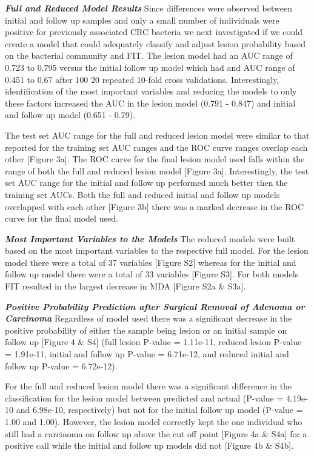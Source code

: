 \documentclass[12pt,]{article}
\begin{document}
\textbf{\emph{Full and Reduced Model Results}} Since differences were
observed between initial and follow up samples and only a small number
of individuals were positive for previously associated CRC bacteria we
next investigated if we could create a model that could adequately
classify and adjust lesion probability based on the bacterial community
and FIT. The lesion model had an AUC range of 0.723 to 0.795 versus the
initial follow up model which had and AUC range of 0.451 to 0.67 after
100 20 repeated 10-fold cross validations. Interestingly, identification
of the most important variables and reducing the models to only these
factors increased the AUC in the lesion model (0.791 - 0.847) and
initial and follow up model (0.651 - 0.79).

The test set AUC range for the full and reduced lesion model were
similar to that reported for the training set AUC ranges and the ROC
curve ranges overlap each other {[}Figure 3a{]}. The ROC curve for the
final lesion model used falls within the range of both the full and
reduced lesion model {[}Figure 3a{]}. Interestingly, the test set AUC
range for the initial and follow up performed much better then the
training set AUCs. Both the full and reduced initial and follow up
models overlapped with each other {[}Figure 3b{]} there was a marked
decrease in the ROC curve for the final model used.

\textbf{\emph{Most Important Variables to the Models}} The reduced
models were built based on the most important variables to the
respective full model. For the lesion model there were a total of 37
variables {[}Figure S2{]} whereas for the initial and follow up model
there were a total of 33 variables {[}Figure S3{]}. For both models FIT
resulted in the largest decrease in MDA {[}Figure S2a \& S3a{]}.

\textbf{\emph{Positive Probability Prediction after Surgical Removal of
Adenoma or Carcinoma}} Regardless of model used there was a significant
decrease in the positive probability of either the sample being lesion
or an initial sample on follow up {[}Figure 4 \& S4{]} (full lesion
P-value = 1.11e-11, reduced lesion P-value = 1.91e-11, initial and
follow up P-value = 6.71e-12, and reduced initial and follow up P-value
= 6.72e-12).

For the full and reduced lesion model there was a significant difference
in the classification for the lesion model between predicted and actual
(P-value = 4.19e-10 and 6.98e-10, respectively) but not for the initial
follow up model (P-value = 1.00 and 1.00). However, the lesion model
correctly kept the one individual who still had a carcinoma on follow up
above the cut off point {[}Figure 4a \& S4a{]} for a positive call while
the initial and follow up models did not {[}Figure 4b \& S4b{]}.
\end{document}
